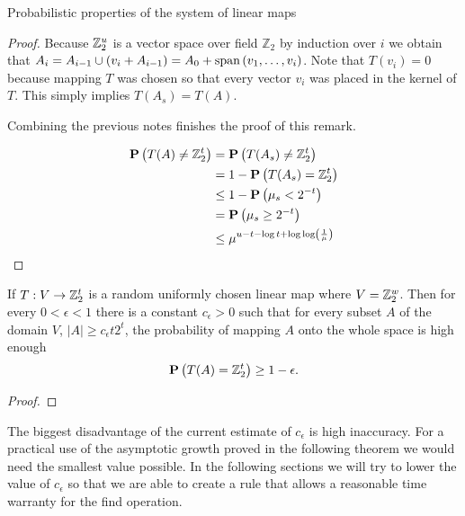 \begin{section}{Probabilistic properties of the system of linear maps}
\begin{proof}
Because $\mathbb{Z}_{2}^{u}$ is a vector space over field $\mathbb{Z}_2$ by induction over $i$ we obtain that $A_i = A_{i - 1} \cup (v_i + A_{i - 1}) = A_0 + \mathrm{span}\left({v_1, \dots, v_i}\right)$. Note that $T(v_i) = 0$ because mapping $T$ was chosen so that every vector $v_i$ was placed in the kernel of $T$. This simply implies $T(A_s) = T(A)$.

Combining the previous notes finishes the proof of this remark.

\[
\begin{split}
\mathbf{P}\left(T(A) \neq \mathbb{Z}_{2}^{t}\right) 
	& = \mathbf{P}\left(T(A_s) \neq \mathbb{Z}_{2}^{t}\right)  \\
	& = 1 - \mathbf{P}\left(T(A_s) = \mathbb{Z}_{2}^{t}\right) \\
	& \leq 1 - \mathbf{P}\left(\mu_s < 2 ^ {-t}\right) \\
	& = \mathbf{P}\left(\mu_s \geq 2 ^ {-t}\right) \\
	& \leq \mu ^ {u - t - \log t + \log \log \left(\frac{1}{\mu}\right)} \\
\end{split}
\]
\end{proof}

\begin{theorem}
\label{theorem-set-onto-by-linear-transform}
If $T: V \rightarrow \mathbb{Z}_{2}^{t}$ is a random uniformly chosen linear map where $V = \mathbb{Z}_{2}^{w}$. Then for every $0 < \epsilon < 1$ there is a constant $c_\epsilon > 0$ such that for every subset $A$ of the domain $V$, $|A| \geq c_\epsilon t 2^t$, the probability of mapping $A$ onto the whole space is high enough
\[
	\mathbf{P}\left(T(A) = \mathbb{Z}_{2}^{t}\right) \geq 1 - \epsilon \text{.}
\]
\end{theorem}
\begin{proof}

\end{proof}

The biggest disadvantage of the current estimate of $c_\epsilon$ is high inaccuracy. For a practical use of the asymptotic growth proved in the following theorem we would need the smallest value possible. In the following sections we will try to lower the value of $c_\epsilon$ so that we are able to create a rule that allows a reasonable time warranty for the find operation.
\end{section}
